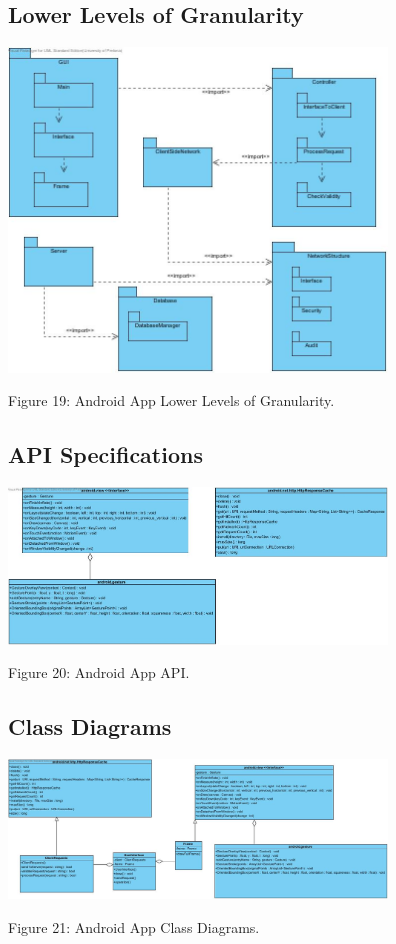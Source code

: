 \documentclass[a4paper]{article}
\begin{document}
\subsection*{Lower Levels of Granularity}
\includegraphics[width=380px]{Images/APPGRANULARITY.jpg}
\begin{center}
Figure 19: Android App Lower Levels of Granularity.
\end{center}

\subsection*{API Specifications}
\includegraphics[width=380px]{Images/APPAPI.jpg}
\begin{center}
Figure 20: Android App API.
\end{center}

\subsection*{Class Diagrams}
\includegraphics[width=380px]{Images/APPCD.jpg}
\begin{center}
Figure 21: Android App Class Diagrams.
\end{center}
\end{document}
